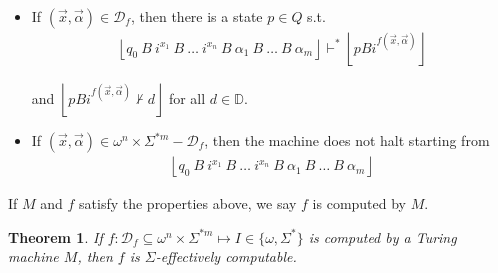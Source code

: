 \documentclass[a4paper, 12pt]{article}
\newtheorem{theorem}{Theorem}
\newtheorem{theorem}{Theorem}
\begin{document}
\begin{itemize}
    \item If $(\vec{x}, \vec{\alpha}) \in \mathcal{D}_f$, then there is a state
        $p \in Q$ s.t. 
        \begin{align*}
            \left\lfloor q_0 ~ B ~ i^{x_1} ~ B ~ \ldots ~ i^{x_n} ~ B ~ \alpha_1
            ~ B ~ \ldots ~ B ~ \alpha_m\right\rfloor \vdash^* \left\lfloor pB
            i^{f(\vec{x}, \vec{\alpha})} \right\rfloor
        \end{align*} 
        
        and $\left\lfloor pBi^{f(\vec{x}, \vec{\alpha})} \not\vdash d \right\rfloor$
        for all $d \in \mathbb{D}$.

    \item If $(\vec{x}, \vec{\alpha}) \in \omega^{n} \times \Sigma^{*m} -
        \mathcal{D}_f$, then the machine does not halt starting from  
        \begin{align*}
            \left\lfloor q_0 ~ B ~ i^{x_1} ~ B ~ \ldots ~ i^{x_n} ~ B ~ \alpha_1
            ~ B ~ \ldots ~ B ~ \alpha_m\right\rfloor 
        \end{align*}
\end{itemize}

If $M$ and $f$ satisfy the properties above, we say $f$ is computed by $M$.

\begin{theorem}
    If $f : \mathcal{D}_f \subseteq \omega^{n} \times \Sigma^{*m} \mapsto I \in
    \{\omega, \Sigma^{*}\}$ is computed by a Turing machine $M$, then $f$ is $\Sigma$-effectively
    computable.
\end{theorem}
\end{document}
